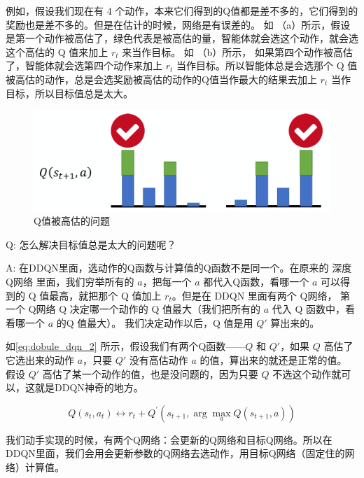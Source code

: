 例如，假设我们现在有 4 个动作，本来它们得到的Q值都是差不多的，它们得到的奖励也是差不多的。但是在估计的时候，网络是有误差的。
如 （a）所示，假设是第一个动作被高估了，绿色代表是被高估的量，智能体就会选这个动作，就会选这个高估的 Q 值来加上 $r_t$ 来当作目标。
如 （b）所示，
如果第四个动作被高估了，智能体就会选第四个动作来加上 $r_t$ 当作目标。所以智能体总是会选那个 Q 值被高估的动作，总是会选奖励被高估的动作的Q值当作最大的结果去加上 $r_t$ 当作目标，所以目标值总是太大。

\begin{figure}[htb]
    \centering
    \includegraphics[width=0.5\linewidth]{res/ch7/7.2}
    \caption{Q值被高估的问题}
    \label{fig:double_dqn_1}
\end{figure}


Q: 怎么解决目标值总是太大的问题呢？

A: 在DDQN里面，选动作的Q函数与计算值的Q函数不是同一个。在原来的 深度Q网络 里面，我们穷举所有的 $a$，把每一个 $a$ 都代入Q函数，看哪一个 $a$ 可以得到的 Q 值最高，就把那个 Q 值加上 $r_t$。但是在 DDQN 里面有两个 Q网络，
    第一个 Q网络 Q 决定哪一个动作的 Q 值最大（我们把所有的 $a$ 代入 Q 函数中，看看哪一个 $a$ 的Q 值最大）。
    我们决定动作以后，Q 值是用 $Q'$ 算出来的。

如\eqref{eq:dobule_dqn_2} 所示，假设我们有两个Q函数------$Q$ 和 $Q'$，如果 $Q$ 高估了它选出来的动作 $a$，只要 $Q'$ 没有高估动作 $a$ 的值，算出来的就还是正常的值。
假设 $Q'$ 高估了某一个动作的值，也是没问题的，因为只要 $Q$ 不选这个动作就可以，这就是DDQN神奇的地方。

\begin{equation}
    \label{eq:dobule_dqn_2}
    Q\left(s_{t}, a_{t}\right) \longleftrightarrow r_{t}+Q^{\prime}\left(s_{t+1}, \arg \max _{a} Q\left(s_{t+1}, a\right)\right)
\end{equation}

我们动手实现的时候，有两个Q网络：会更新的Q网络和目标Q网络。所以在DDQN里面，我们会用会更新参数的Q网络去选动作，用目标Q网络（固定住的网络）计算值。

